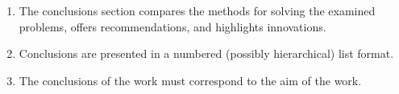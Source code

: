 \begin{enumerate}[labelindent=0pt]
    \item The conclusions section compares the methods for solving the examined problems, offers recommendations, and highlights innovations.
    \item Conclusions are presented in a numbered (possibly hierarchical) list format.
    \item The conclusions of the work must correspond to the aim of the work.
\end{enumerate}